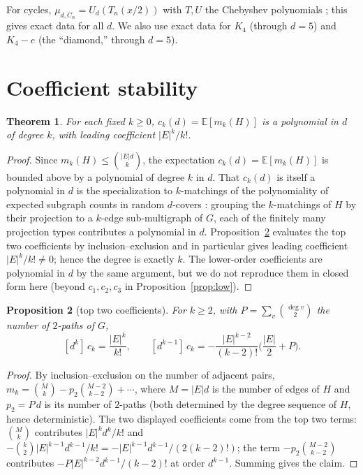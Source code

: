 \documentclass[11pt]{article}
\newtheorem{theorem}{Theorem}
\newtheorem{proposition}[theorem]{Proposition}
\theoremstyle{remark}
\newcommand{\E}{\mathbb{E}}
\begin{document}
For cycles, $\mu_{d,C_n}=U_d(T_n(x/2))$ with $T,U$ the Chebyshev polynomials
\cite{CGHRS}; this gives exact data for all $d$. We also use exact data for
$K_4$ (through $d=5$) and $K_4-e$ (the ``diamond,'' through $d=5$).

\section{Coefficient stability}

\begin{theorem}\label{thm:stab}
For each fixed $k\ge 0$, $c_k(d)=\E[m_k(H)]$ is a polynomial in $d$ of degree
$k$, with leading coefficient $|E|^k/k!$.
\end{theorem}

\begin{proof}
Since $m_k(H)\le\binom{|E|d}{k}$, the expectation $c_k(d)=\E[m_k(H)]$ is bounded
above by a polynomial of degree $k$ in $d$. That $c_k(d)$ is itself a polynomial
in $d$ is the specialization to $k$-matchings of the polynomiality of expected
subgraph counts in random $d$-covers \cite{LP}: grouping the $k$-matchings of $H$
by their projection to a $k$-edge sub-multigraph of $G$, each of the finitely many
projection types contributes a polynomial in $d$. Proposition~\ref{prop:top}
evaluates the top two coefficients by inclusion--exclusion and in particular gives
leading coefficient $|E|^k/k!\neq0$; hence the degree is exactly $k$. The
lower-order coefficients are polynomial in $d$ by the same argument, but we do not
reproduce them in closed form here (beyond $c_1,c_2,c_3$ in
Proposition~\ref{prop:low}).
\end{proof}

\begin{proposition}[top two coefficients]\label{prop:top}
For $k\ge 2$, with $P=\sum_{v}\binom{\deg v}{2}$ the number of $2$-paths of $G$,
\[
[d^k]\,c_k = \frac{|E|^k}{k!},\qquad
[d^{k-1}]\,c_k = -\frac{|E|^{k-2}}{(k-2)!}\Big(\frac{|E|}{2}+P\Big).
\]
\end{proposition}

\begin{proof}
By inclusion--exclusion on the number of adjacent pairs,
$m_k = \binom{M}{k} - p_2\binom{M-2}{k-2}+\cdots$, where $M=|E|d$ is the number
of edges of $H$ and $p_2=P\,d$ is its number of $2$-paths (both determined by
the degree sequence of $H$, hence deterministic). The two displayed
coefficients come from the top two terms: $\binom{M}{k}$ contributes
$|E|^k d^k/k!$ and $-\binom{k}{2}|E|^{k-1}d^{k-1}/k! = -|E|^{k-1}d^{k-1}/(2(k-2)!)$;
the term $-p_2\binom{M-2}{k-2}$ contributes $-P|E|^{k-2}d^{k-1}/(k-2)!$ at order
$d^{k-1}$. Summing gives the claim.
\end{proof}
\end{document}
